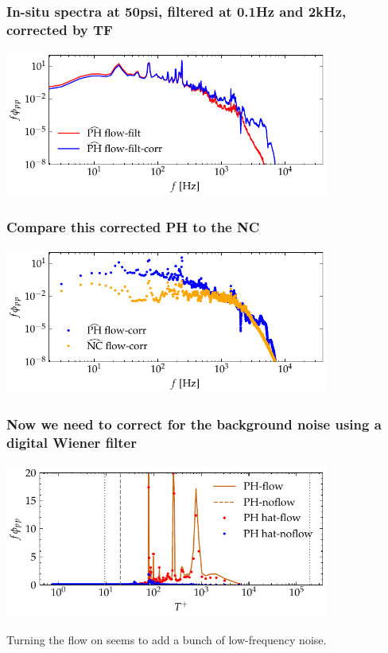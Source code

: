 \documentclass[aspectratio=169,9pt]{beamer}
\begin{document}
\begin{frame}
    \frametitle{In-situ spectra at 50psi, filtered at 0.1Hz and 2kHz, corrected by TF}
        \centering
        \includegraphics[width=0.8\textwidth]{sanity/50psi/PH-NKD/calib_spectra_50psi_f_filt_TF.pdf}
\end{frame}

\begin{frame}
    \frametitle{Compare this corrected PH to the NC}
        \centering
        \includegraphics[width=0.8\textwidth]{sanity/50psi/PH-NKD/calib_spectra_50psi_flow_NC_PH.pdf}
\end{frame}
\begin{frame}
    \frametitle{Now we need to correct for the background noise using a digital Wiener filter}
        \centering
        \includegraphics[width=0.8\textwidth]{sanity/50psi/PH-NKD/calib_spectra_50psi_flow_recon.pdf}

        \centering
        Turning the flow on seems to add a bunch of low-frequency noise.
\end{frame}
\end{document}
